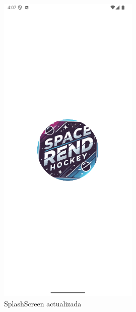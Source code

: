 \documentclass[a4paper,openright,12pt]{article}
\begin{document}
\begin{figure}[htp]
    \centering
    \begin{minipage}{0.3\textwidth}
        \centering
        \includegraphics[width=0.6\textwidth]{Images/Vista_It4.png} 
        \caption{SplashScreen actualizada}
        \label{fig:SplashScreen actualizada}
    \end{minipage}
    \hfill
    \begin{minipage}{0.3\textwidth}
        \centering

\end{minipage}
\end{figure}
\end{document}
